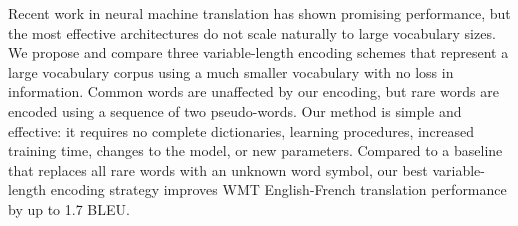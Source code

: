 Recent work in neural machine translation has shown promising performance, but the most effective architectures do not scale naturally to large vocabulary sizes. We propose and compare three variable-length encoding schemes that represent a large vocabulary corpus using a much smaller vocabulary with no loss in information. Common words are unaffected by our encoding, but rare words are encoded using a sequence of two pseudo-words. Our method is simple and effective: it requires no complete dictionaries, learning procedures, increased training time, changes to the model, or new parameters. Compared to a baseline that replaces all rare words with an unknown word symbol, our best variable-length encoding strategy improves WMT English-French translation performance by up to 1.7 BLEU.
